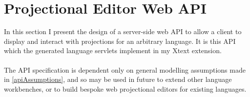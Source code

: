 \documentclass{article}
\begin{document}
\section{Projectional Editor Web API}\label{api}
In this section I present the design of a server-side web API to allow a client to display and interact with projections for an arbitrary language. It is this API which the generated language servlets implement in my Xtext extension. 
\\
\\
The API specification is dependent only on general modelling assumptions made in \ref{apiAssumptions}, and so may be used in future to extend other language workbenches, or to build bespoke web projectional editors for existing languages.
\end{document}
